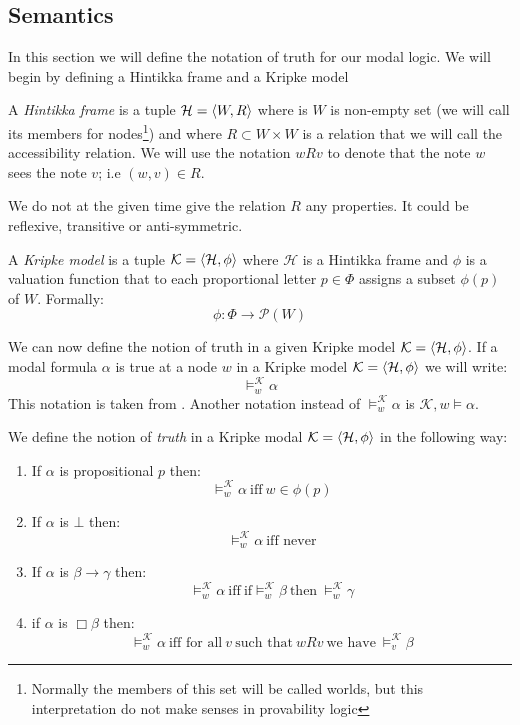 \documentclass[../main.tex]{subfiles}
\begin{document}
\subsection{Semantics}
In this section we will define the notation of truth for our modal logic. We
will begin by defining a Hintikka frame and a Kripke model
\begin{defi}
	A \textit{Hintikka frame} is a tuple $\mathcal{H}=\langle W,R\rangle$ where is $W$ is
	non-empty set (we will call its members for nodes\footnote{Normally
		the members of this set will be called worlds, but this
	interpretation do not make senses in provability logic}) and where $R\subset
	W\times W$ is a relation that we will call the accessibility relation.
	We will use the notation $wRv$ to denote that the note $w$ sees the note
	$v$; i.e $(w,v)\in R$.
\end{defi}
We do not at the given time give the relation $R$ any properties. It could be
reflexive, transitive or anti-symmetric.
\begin{defi}
	A \textit{Kripke model} is a tuple $\mathcal{K}=\langle \mathcal{H},\phi\rangle$ where
	$\mathcal{H}$ is a Hintikka frame and $\phi$ is a valuation function that to
	each proportional letter $p\in \Phi$ assigns a subset $\phi(p)$ of $W$.
	Formally:
	\[\phi:\Phi\rightarrow\mathcal{P}(W)\]
\end{defi}
We can now define the notion of truth in a given Kripke model $\mathcal{K}=\langle
\mathcal{H},\phi\rangle$. If a modal formula $\alpha$ is true at a node $w$ in a
Kripke model $\mathcal{K}=\langle \mathcal{H},\phi\rangle$ we will write:
\[\vDash_w^\mathcal{K}\alpha\]
This notation is taken from \cite{Lemmon1977}. Another notation instead of
$\vDash^\mathcal{K}_w\alpha$ is $\mathcal{K},w\vDash\alpha$.
\begin{defi}
	We define the notion of \textit{truth} in a Kripke modal $\mathcal{K}=\langle
	\mathcal{H},\phi\rangle$ in the
	following way:
	\begin{enumerate}
		\item If $\alpha$ is propositional $p$ then:
			\[\vDash_w^\mathcal{K}\alpha\ \text{iff}\ w\in\phi(p)\]
		\item If $\alpha$ is $\bot$ then:
			\[\vDash_w^\mathcal{K}\alpha\ \text{iff never} \]
		\item If $\alpha$ is $\beta\rightarrow\gamma$ then:
			\[\vDash_w^\mathcal{K}\alpha\ \text{iff}\ \text{if}
				\vDash_w^\mathcal{K}\beta\ \text{then}\
			\vDash_w^\mathcal{K}\gamma\]
		\item if $\alpha$ is $\Box\beta$ then:
			\[\vDash_w^\mathcal{K}\alpha\ \text{iff for all}\ v\
				\text{such that}\ wRv\ \text{we have}\
			\vDash_v^\mathcal{K}\beta\]
	\end{enumerate}
\end{defi}
\end{document}
